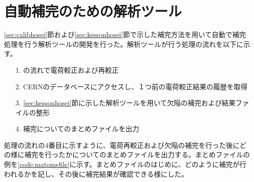 \section{自動補完のための解析ツール}
\label{sec:kaisekitool}
\ref{sec:calibhosei}節および\ref{sec:kessonhosei}節で示した補完方法を用いて自動で補完処理を行う解析ツールの開発を行った。解析ツールが行う処理の流れを以下に示す。

\begin{itemize}
  \item[1. ] の流れで電荷較正および再較正
  \item[2. ] CERNのデータベースにアクセスし、１つ前の電荷較正結果の履歴を取得
  \item[3. ] \ref{sec:kessonhosei}節に示した解析ツールを用いて欠陥の補完および結果ファイルの整形
  \item[4. ] 補完についてのまとめファイルを出力
\end{itemize}

処理の流れの4番目に示すように、電荷再較正および欠陥の補完を行った後にどの様に補完を行ったかについてのまとめファイルを出力する。まとめファイルの例を\cref{code:matomefile}に示す。まとめファイルのはじめに、どのように補完が行われるかを記し、その後に補完結果が確認できる様にした。


